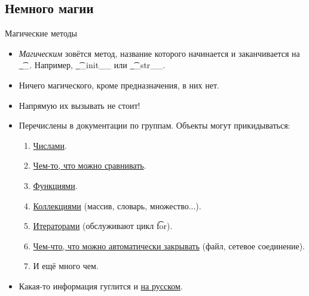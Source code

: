 \subsection{Немного магии}
\begin{frame}{Магические методы}
	\begin{itemize}
		\item
			\textit{Магическим} зовётся метод, название которого начинается и заканчивается на \t{\_\_}.
			Например, \t{\_\_init\_\_} или \t{\_\_str\_\_}.
		\item Ничего магического, кроме предназначения, в них нет.
		\item Напрямую их вызывать не стоит!
		\item Перечислены в документации по группам. Объекты могут прикидываться:
			\begin{enumerate}
				\item \href{https://docs.python.org/3/reference/datamodel.html\#emulating-numeric-types}{Числами}.
				\item \href{https://docs.python.org/3/reference/datamodel.html\#object.\_\_lt\_\_}{Чем-то, что можно сравнивать}.
				\item \href{https://docs.python.org/3/reference/datamodel.html\#emulating-callable-objects}{Функциями}.
				\item \href{https://docs.python.org/3/reference/datamodel.html\#emulating-container-types}{Коллекциями} (массив, словарь, множество...).
				\item \href{https://docs.python.org/3/library/stdtypes.html\#typeiter}{Итераторами} (обслуживают цикл \t{for}).
				\item \href{https://docs.python.org/3/reference/datamodel.html\#with-statement-context-managers}{Чем-что, что можно автоматически закрывать} (файл, сетевое соединение).
				\item И ещё много чем.
			\end{enumerate}
		\item Какая-то информация гуглится и \href{https://pythonworld.ru/osnovy/peregruzka-operatorov.html}{на русском}.
	\end{itemize}
\end{frame}
